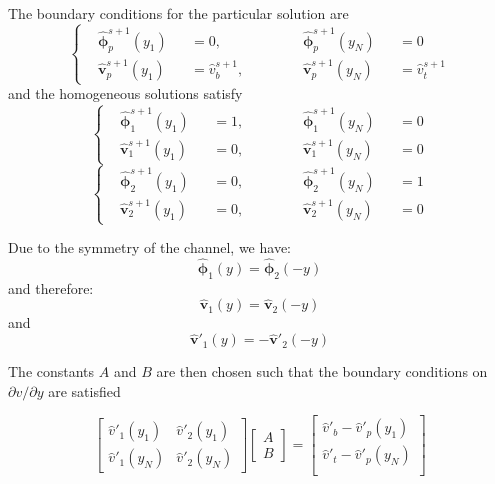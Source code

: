 \documentclass[titlepage,12pt,letter]{article}
\numberwithin{equation}{section}
\begin{document}
The boundary conditions for the particular solution are
\begin{equation}
	\left\{
\begin{aligned}
	&\hat{\bm{\phi}}_{p}^{s+1}\left(y_{1}\right)&&=0, &&\quad &&\hat{\bm{\phi}}_{p}^{s+1}\left(y_{N}\right)&&=0 \\
	&\hat{\bm{v}}_{p}^{s+1}\left(y_{1}\right)&&=\hat{{v}}_{b}^{s+1}, &&\quad &&\hat{\bm{v}}_{p}^{s+1}\left(y_{N}\right)&&=\hat{{v}}_{t}^{s+1}
\end{aligned}\right.\label{eq:phip_bc}
\end{equation}
and the homogeneous solutions satisfy
\begin{equation}
	\left\{\begin{aligned}
	&\hat{\bm{\phi}}_{1}^{s+1}\left(y_{1}\right)&&=1, &&\quad &&\hat{\bm{\phi}}_{1}^{s+1}\left(y_{N}\right)&&=0 \\
	&\hat{\bm{v}}_{1}^{s+1}\left(y_{1}\right)&&=0, &&\quad &&\hat{\bm{v}}_{1}^{s+1}\left(y_{N}\right)&&=0
\end{aligned}\right. \label{eq:phi1_bc}
\end{equation}
\begin{equation}
 \left\{	\begin{aligned}
	&\hat{\bm{\phi}}_{2}^{s+1}\left(y_{1}\right)&&=0, &&\quad &&\hat{\bm{\phi}}_{2}^{s+1}\left(y_{N}\right)&&=1 \\
	&\hat{\bm{v}}_{2}^{s+1}\left(y_{1}\right)&&=0, &&\quad &&\hat{\bm{v}}_{2}^{s+1}\left(y_{N}\right)&&=0
\end{aligned}\right. \label{eq:phi2_bc}
\end{equation}

Due to the symmetry of the channel, we have:
\begin{equation*}
	\hat{\bm{\phi}}_1(y) = \hat{\bm{\phi}}_2(-y)
\end{equation*}
and therefore:
\begin{equation*}
	\hat{\bm{v}}_1(y) = \hat{\bm{v}}_2(-y)
\end{equation*}
and
\begin{equation*}
	\hat{\bm{v}}'_1(y) = -\hat{\bm{v}}'_2(-y)
\end{equation*}

The constants $A$ and $B$ are then chosen such that the boundary conditions on $\partial v / \partial y$ are satisfied

\begin{equation*}
	\renewcommand{\arraystretch}{2}
\begin{bmatrix}
	\hat{v}'_1\left(y_{1}\right) & \hat{v}'_2\left(y_{1}\right) \\
	\hat{v}'_1\left(y_{N}\right) & \hat{v}'_2\left(y_{N}\right)
\end{bmatrix}
\begin{bmatrix}
	A\\ B
\end{bmatrix}
=
\begin{bmatrix}
	\hat{v}'_b-\hat{v}'_p\left(y_{1}\right) \\
	\hat{v}'_t-\hat{v}'_p\left(y_{N}\right) \\
\end{bmatrix}
\end{equation*}
\end{document}
